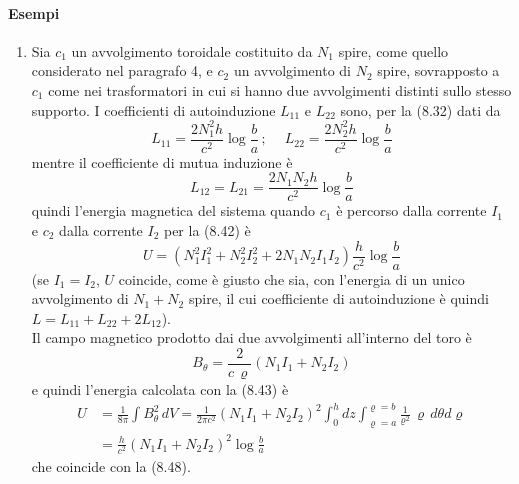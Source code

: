 \paragraph{Esempi}
\begin{enumerate}
  \item Sia $c_1$ un avvolgimento toroidale costituito da $N_1$ spire, come
    quello considerato nel paragrafo 4, e $c_2$ un avvolgimento di $N_2$ spire,
    sovrapposto a $c_1$ come nei trasformatori in cui si hanno due avvolgimenti
    distinti sullo stesso supporto. I coefficienti di autoinduzione $L_{11}$ e
    $L_{22}$ sono, per la (8.32) dati da
    \begin{equation}
      L_{11}=\frac{2N_1^2h}{c^2}\log\frac{b}{a}\,;
      \quad\ L_{22}=\frac{2N_2^2h}{c^2}\log\frac{b}{a}
      \tag{8.46}
    \end{equation}
    mentre il coefficiente di mutua induzione \`e
    \begin{equation}
      L_{12}=L_{21}=\frac{2N_1N_2h}{c^2}\log\frac{b}{a}
      \tag{8.47}
    \end{equation}
    quindi l'energia magnetica del sistema quando $c_1$ \`e percorso dalla
    corrente $I_1$ e $c_2$ dalla corrente $I_2$ per la (8.42) \`e
    \begin{equation}
      U=(N_1^2I_1^2+N_2^2I_2^2+2N_1N_2I_1I_2)\frac{h}{c^2}\log\frac{b}{a}
      \tag{8.48}
    \end{equation}
    (se $I_1=I_2$, $U$ coincide, come \`e giusto che sia, con l'energia di un
    unico avvolgimento di $N_1+N_2$ spire, il cui coefficiente di autoinduzione
    \`e quindi \ $L=L_{11}+L_{22}+2L_{12}$).\\
    Il campo magnetico prodotto dai due avvolgimenti all'interno del toro \`e
    \begin{equation}
      B_\theta=\frac{2}{c\,\varrho}(N_1I_1+N_2I_2)
      \tag{8.49}
    \end{equation}
    e quindi l'energia calcolata con la (8.43) \`e
    \begin{equation}
      \begin{aligned}
        U&=\frac{1}{8\pi}\int B_\theta^2\,dV=\frac{1}{2\pi c^2}(N_1I_1+N_2I_2)^2
        \int_0^hdz\int_{\varrho=a}^{\varrho=b}
        \frac{1}{\varrho^2}\,\varrho\,d\theta d\varrho\\
        &=\frac{h}{c^2}(N_1I_1+N_2I_2)^2\log\frac{b}{a}
      \end{aligned}
      \tag{8.50}
    \end{equation}
    che coincide con la (8.48).

\end{enumerate}
